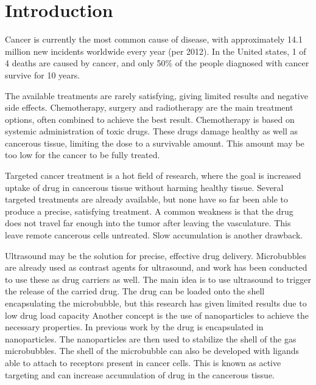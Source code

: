 \section{Introduction}

Cancer is currently the most common cause of disease, with approximately 14.1 million new incidents worldwide every year (per 2012)\cite{cancer1}. In the United states, 1 of 4 deaths are caused by cancer\cite{Siegel2014}, and only 50\% of the people diagnosed with cancer survive for 10 years. 

The available treatments are rarely satisfying, giving limited results and negative side effects\cite{doi:10.1056/NEJM200106283442607}. Chemotherapy, surgery and radiotherapy are the main treatment options, often combined to achieve the best result. Chemotherapy is based on systemic administration of toxic drugs. These drugs damage healthy as well as cancerous tissue, limiting the dose to a survivable amount. This amount may be too low for the cancer to be fully treated.%

Targeted cancer treatment is a hot field of research, where the goal is increased uptake of drug in cancerous tissue without harming healthy tissue. Several targeted treatments are already available, but none have so far been able to produce a precise, satisfying treatment. A common weakness is that the drug does not travel far enough into the tumor after leaving the vasculature\cite{Bae2009}. This leave remote cancerous cells untreated. Slow accumulation is another drawback. 

Ultrasound may be the solution for precise, effective drug delivery. Microbubbles are already used as contrast agents for ultrasound, and work has been conducted to use these as drug carriers as well. The main idea is to use ultrasound to trigger the release of the carried drug. The drug can be loaded onto the shell encapsulating the microbubble, but this research has given limited results due to low drug load capacity\cite{Ibsen2011}%
Another concept is the use of nanoparticles to achieve the necessary properties. In previous work by \citeauthor{Eggen2013} the drug is encapsulated in nanoparticles\cite{Eggen2013}. The nanoparticles are then used to stabilize the shell of the gas microbubbles. The shell of the microbubble can also be developed with ligands able to attach to receptors present in cancer cells\cite{Davis2008}. This is known as active targeting and can increase accumulation of drug in the cancerous tissue.

